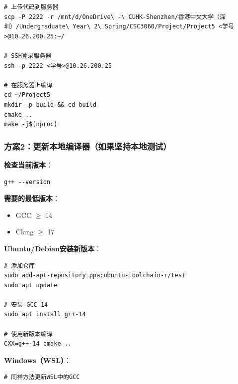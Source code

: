 \documentclass[11pt, a4paper]{article}
\begin{document}
\begin{aibox}
\begin{tcolorbox}[colback=white,colframe=gray!50!white,boxrule=0.5pt,arc=2pt,left=5pt,right=5pt,top=5pt,bottom=5pt]
\begin{verbatim}
# 上传代码到服务器
scp -P 2222 -r /mnt/d/OneDrive\ -\ CUHK-Shenzhen/香港中文大学（深圳）/Undergraduate\ Year\ 2\ Spring/CSC3060/Project/Project5 <学号>@10.26.200.25:~/

# SSH登录服务器
ssh -p 2222 <学号>@10.26.200.25

# 在服务器上编译
cd ~/Project5
mkdir -p build && cd build
cmake ..
make -j$(nproc)
\end{verbatim}
\end{tcolorbox}

\subsubsection*{方案2：更新本地编译器（如果坚持本地测试）}

\textbf{检查当前版本}：
\begin{tcolorbox}[colback=white,colframe=gray!50!white,boxrule=0.5pt,arc=2pt,left=5pt,right=5pt,top=5pt,bottom=5pt]
\begin{verbatim}
g++ --version
\end{verbatim}
\end{tcolorbox}

\textbf{需要的最低版本}：
\begin{itemize}
    \item GCC $\ge$ 14
    \item Clang $\ge$ 17
\end{itemize}

\textbf{Ubuntu/Debian安装新版本}：
\begin{tcolorbox}[colback=white,colframe=gray!50!white,boxrule=0.5pt,arc=2pt,left=5pt,right=5pt,top=5pt,bottom=5pt]
\begin{verbatim}
# 添加仓库
sudo add-apt-repository ppa:ubuntu-toolchain-r/test
sudo apt update

# 安装 GCC 14
sudo apt install g++-14

# 使用新版本编译
CXX=g++-14 cmake ..
\end{verbatim}
\end{tcolorbox}

\textbf{Windows（WSL）}：
\begin{tcolorbox}[colback=white,colframe=gray!50!white,boxrule=0.5pt,arc=2pt,left=5pt,right=5pt,top=5pt,bottom=5pt]
\begin{verbatim}
# 同样方法更新WSL中的GCC
\end{verbatim}
\end{tcolorbox}


\end{aibox}
\end{document}
